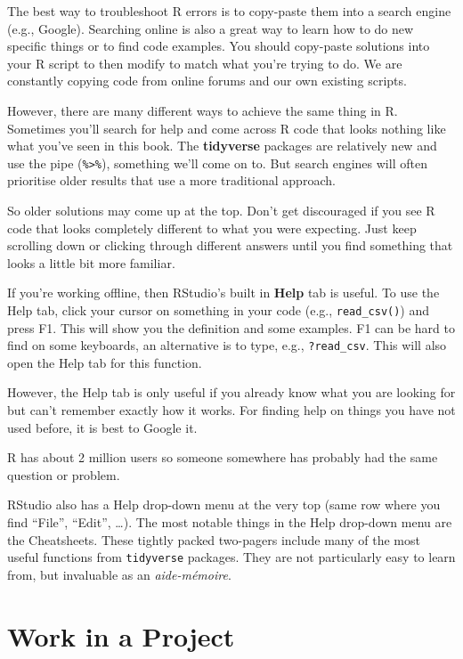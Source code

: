 \documentclass[
  12pt,
  krantz2]{krantz}
\begin{document}

The best way to troubleshoot R errors is to copy-paste them into a search engine (e.g., Google).
Searching online is also a great way to learn how to do new specific things or to find code examples.
You should copy-paste solutions into your R script to then modify to match what you're trying to do.
We are constantly copying code from online forums and our own existing scripts.

However, there are many different ways to achieve the same thing in R.
Sometimes you'll search for help and come across R code that looks nothing like what you've seen in this book.
The \textbf{tidyverse} packages are relatively new and use the pipe (\texttt{\%\textgreater{}\%}), something we'll come on to.
But search engines will often prioritise older results that use a more traditional approach.

So older solutions may come up at the top.
Don't get discouraged if you see R code that looks completely different to what you were expecting.
Just keep scrolling down or clicking through different answers until you find something that looks a little bit more familiar.

If you're working offline, then RStudio's built in \textbf{Help} tab is useful.
To use the Help tab, click your cursor on something in your code (e.g., \texttt{read\_csv()}) and press F1.
This will show you the definition and some examples.
F1 can be hard to find on some keyboards, an alternative is to type, e.g., \texttt{?read\_csv}.
This will also open the Help tab for this function.

However, the Help tab is only useful if you already know what you are looking for but can't remember exactly how it works.
For finding help on things you have not used before, it is best to Google it.

R has about 2 million users so someone somewhere has probably had the same question or problem.

RStudio also has a Help drop-down menu at the very top (same row where you find ``File'', ``Edit'', \ldots).
The most notable things in the Help drop-down menu are the Cheatsheets.
These tightly packed two-pagers include many of the most useful functions from \texttt{tidyverse} packages.
They are not particularly easy to learn from, but invaluable as an \emph{aide-mémoire}.

\hypertarget{work-in-a-project}{%
\section{Work in a Project}\label{work-in-a-project}}
\end{document}
